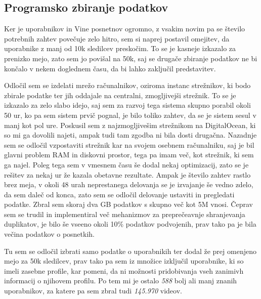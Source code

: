 \documentclass[a4paper,11pt]{article}
\begin{document}
\subsection{Programsko zbiranje podatkov}

Ker je uporabnikov in Vine posnetnov ogromno, z vsakim novim pa se število potrebnih zahtev povečuje zelo hitro, sem si naprej postavil omejitev, da uporabnike z manj od 10k sledilcev preskočim. To se je kasneje izkazalo za prenizko mejo, zato sem jo povišal na 50k, saj se drugače zbiranje podatkov ne bi končalo v nekem doglednem času, da bi lahko zaključil predstavitev.
\par
Odločil sem se izdelati mrežo računalnikov, oziroma instanc strežnikov, ki bodo zbirale podatke ter jih oddajale na centralni, zmogljivejši strežnik. To se je izkazalo za zelo slabo idejo, saj sem za razvoj tega sistema skupno porabil okoli 50 ur, ko pa sem sistem prvič pognal, je bilo toliko zahtev, da se je sistem sesul v manj kot pol ure. Poskusil sem z najzmogljivešim strežnikom na DigitalOcean, ki so mi ga dovolili najeti, ampak tudi tam zgodba ni bila dosti drugačna. Nazadnje sem se odločil vzpostaviti strežnik kar na svojem osebnem računalniku, saj je bil glavni problem RAM in diskovni prostor, tega pa imam več, kot strežnik, ki sem ga najel. Poleg tega sem v vmesnem času še dodal nekaj optimizacij, zato se je rešitev za nekaj ur že kazala obetavne rezultate. Ampak je število zahtev rastlo brez meja, v okoli 48 urah neprestanega delovanja se je izvajanje še vedno zdelo, da sem daleč od konca, zato sem se odločil delovanje ustaviti in pregledati podatke. Zbral sem skoraj dva GB podatkov s skupno več kot 5M vnosi. Čeprav sem se trudil in implementiral več mehanizmov za preprečeavnje shranjevanja duplikatov, je bilo še vseeno okoli 10\% podatkov podvojenih, prav tako pa je bila večina podatkov o posnetkih.
\par
Tu sem se odločil izbrati samo podatke o uporabnikih ter dodal že prej omenjeno mejo za 50k sledilcev, prav tako pa sem iz množice izključil uporabnike, ki so imeli zasebne profile, kar pomeni, da ni možnosti pridobivanja vseh zanimivh informacij o njihovem profilu. Po tem mi je ostalo \textit{588} bolj ali manj znanih uporabnikov, za katere pa sem zbral tudi \textit{145.970} videov.
\end{document}
